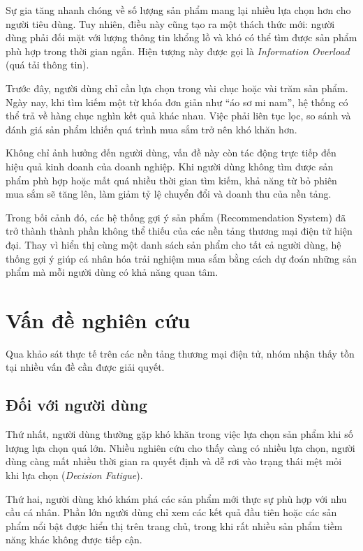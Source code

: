 \documentclass{report}
\begin{document}
Sự gia tăng nhanh chóng về số lượng sản phẩm mang lại nhiều lựa chọn hơn cho người tiêu dùng. Tuy nhiên, điều này cũng tạo ra một thách thức mới: người dùng phải đối mặt với lượng thông tin khổng lồ và khó có thể tìm được sản phẩm phù hợp trong thời gian ngắn. Hiện tượng này được gọi là \textit{Information Overload} (quá tải thông tin).

Trước đây, người dùng chỉ cần lựa chọn trong vài chục hoặc vài trăm sản phẩm. Ngày nay, khi tìm kiếm một từ khóa đơn giản như ``áo sơ mi nam'', hệ thống có thể trả về hàng chục nghìn kết quả khác nhau. Việc phải liên tục lọc, so sánh và đánh giá sản phẩm khiến quá trình mua sắm trở nên khó khăn hơn.

Không chỉ ảnh hưởng đến người dùng, vấn đề này còn tác động trực tiếp đến hiệu quả kinh doanh của doanh nghiệp. Khi người dùng không tìm được sản phẩm phù hợp hoặc mất quá nhiều thời gian tìm kiếm, khả năng từ bỏ phiên mua sắm sẽ tăng lên, làm giảm tỷ lệ chuyển đổi và doanh thu của nền tảng.

Trong bối cảnh đó, các hệ thống gợi ý sản phẩm (Recommendation System) đã trở thành thành phần không thể thiếu của các nền tảng thương mại điện tử hiện đại. Thay vì hiển thị cùng một danh sách sản phẩm cho tất cả người dùng, hệ thống gợi ý giúp cá nhân hóa trải nghiệm mua sắm bằng cách dự đoán những sản phẩm mà mỗi người dùng có khả năng quan tâm.

\section{Vấn đề nghiên cứu}

Qua khảo sát thực tế trên các nền tảng thương mại điện tử, nhóm nhận thấy tồn tại nhiều vấn đề cần được giải quyết.

\subsection*{Đối với người dùng}

Thứ nhất, người dùng thường gặp khó khăn trong việc lựa chọn sản phẩm khi số lượng lựa chọn quá lớn. Nhiều nghiên cứu cho thấy càng có nhiều lựa chọn, người dùng càng mất nhiều thời gian ra quyết định và dễ rơi vào trạng thái mệt mỏi khi lựa chọn (\textit{Decision Fatigue}).

Thứ hai, người dùng khó khám phá các sản phẩm mới thực sự phù hợp với nhu cầu cá nhân. Phần lớn người dùng chỉ xem các kết quả đầu tiên hoặc các sản phẩm nổi bật được hiển thị trên trang chủ, trong khi rất nhiều sản phẩm tiềm năng khác không được tiếp cận.
\end{document}
